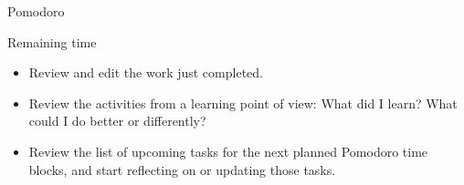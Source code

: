 \begin{frame}{Pomodoro}
  \begin{block}{Remaining time}
    \begin{itemize}
      \item Review and edit the work just completed.
      \item Review the activities from a learning point of view: What did I learn? What could I do better or differently?
      \item Review the list of upcoming tasks for the next planned Pomodoro time blocks, and start reflecting on or updating those tasks.
    \end{itemize}
  \end{block}
\end{frame}

